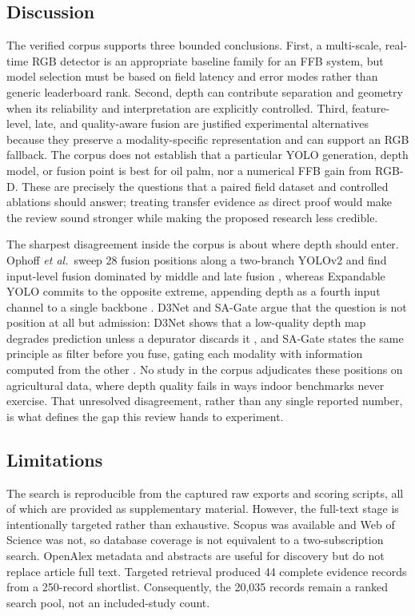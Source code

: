 \subsection{Discussion}

The verified corpus supports three bounded conclusions. First, a multi-scale, real-time RGB detector is an appropriate baseline family for an FFB system, but model selection must be based on field latency and error modes rather than generic leaderboard rank. Second, depth can contribute separation and geometry when its reliability and interpretation are explicitly controlled. Third, feature-level, late, and quality-aware fusion are justified experimental alternatives because they preserve a modality-specific representation and can support an RGB fallback. The corpus does not establish that a particular YOLO generation, depth model, or fusion point is best for oil palm, nor a numerical FFB gain from RGB-D. These are precisely the questions that a paired field dataset and controlled ablations should answer; treating transfer evidence as direct proof would make the review sound stronger while making the proposed research less credible.

The sharpest disagreement inside the corpus is about where depth should enter. Ophoff \textit{et al.}\ sweep 28 fusion positions along a two-branch YOLOv2 and find input-level fusion dominated by middle and late fusion \cite{ophoff2019multimodal}, whereas Expandable YOLO commits to the opposite extreme, appending depth as a fourth input channel to a single backbone \cite{takahashi2020expandableyolo}. D3Net and SA-Gate argue that the question is not position at all but admission: D3Net shows that a low-quality depth map degrades prediction unless a depurator discards it \cite{fan2020d3net}, and SA-Gate states the same principle as filter before you fuse, gating each modality with information computed from the other \cite{chen2020sagate}. No study in the corpus adjudicates these positions on agricultural data, where depth quality fails in ways indoor benchmarks never exercise. That unresolved disagreement, rather than any single reported number, is what defines the gap this review hands to experiment.

\subsection{Limitations}
\label{sec:limitations}

The search is reproducible from the captured raw exports and scoring scripts, all of which are provided as supplementary material. However, the full-text stage is intentionally targeted rather than exhaustive. Scopus was available and Web of Science was not, so database coverage is not equivalent to a two-subscription search. OpenAlex metadata and abstracts are useful for discovery but do not replace article full text. Targeted retrieval produced 44 complete evidence records from a 250-record shortlist. Consequently, the 20,035 records remain a ranked search pool, not an included-study count.

